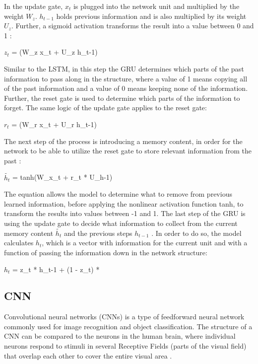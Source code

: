 \indent\newline 
In the update gate, $x_{t}$ is plugged into the network unit and multiplied by the weight $W_{z}$. $h_{t-1}$ holds previous information and is also multiplied by its weight $U_{z}$. Further, a sigmoid activation transforms the result into a value between 0 and 1 \cite{kosta}:

\indent\newline 
$z_{t}$ = \sigma(W_{z} x_{t} + U_{z} h_{t-1})

\indent\newline 
Similar to the LSTM, in this step the GRU determines which parts of the past information to pass along in the structure, where a value of 1 means copying all of the past information and a value of 0 means keeping none of the information. Further, the reset gate is used to determine which parts of the information to forget. The same logic of the update gate applies to the reset gate:

\indent\newline 
$r_{t}$ = \sigma(W_{r} x_{t} + U_{r} h_{t-1})

\indent\newline 
The next step of the process is introducing a memory content, in order for the network to be able to utilize the reset gate to store relevant information from the past \cite{kosta}:

\indent\newline 
$\tilde{h_{t}}$ = tanh(W_{x_{t}} + r_{t} * U_{h-1})

\indent\newline 
The equation allows the model to determine what to remove from previous learned information, before applying the nonlinear activation function tanh, to transform the results into values between -1 and 1. The last step of the GRU is using the update gate to decide what information to collect from the current memory content $\tilde{h_{t}}$ and the previous steps $h_{t-1}$ \cite{kosta}. In order to do so, the model calculates $h_{t}$, which is a vector with information for the current unit and with a function of passing the information down in the network structure:

\indent\newline 
$h_{t}$ = z_{t} * h_{t-1} + (1 - z_{t}) * 

\subsection{CNN}
Convolutional neural networks (CNNs) is a type of feedforward neural network commonly used for image recognition and object classification. The structure of a CNN can be compared to the neurons in the human brain, where individual neurons respond to stimuli in several Receptive Fields (parts of the visual field) that overlap each other to cover the entire visual area \cite{saha}.   

